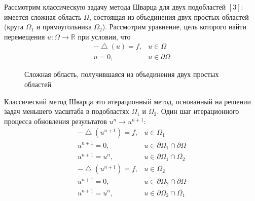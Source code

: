 \documentclass[a4paper, 14pt]{extarticle}
\begin{document}
Рассмотрим классическую задачу метода Шварца для двух подобластей $\left[3\right]$: имеется сложная область $\Omega$, состоящая из объединения двух простых областей (круга $\Omega_1$ и прямоугольника $\Omega_2$). Рассмотрим уравнение, цель которого найти перемещения $u: \Omega \rightarrow \mathbb{R}$ при условии, что
\begin{equation*}
\begin{array}{rl}
-\bigtriangleup \!(u) = f, & u \in \Omega \\
u = 0, & u \in \partial \Omega
\end{array}
\end{equation*}

\begin{figure}[h]
\caption{Сложная область, получившаяся из объединения двух простых областей}
\label{fig:image_01}
\end{figure}

Классический метод Шварца это итерационный метод, основанный на решении задач меньшего масштаба в подобластях $\Omega_1$ и $\Omega_2$. Один шаг итерационного процесса обновления результатов $u^n \rightarrow u^{n+1}$:
\begin{eqnarray*}
-\bigtriangleup \! (u^{n+1}) = f, & u \in \Omega_1 \\
u^{n+1} = 0, & u \in \partial \Omega_1 \cap \partial \Omega \\
u^{n+1} = u^n, & u \in \partial \Omega_1 \cap \bar{\Omega_2}
\end{eqnarray*}
\begin{eqnarray*}
-\bigtriangleup \! (u^{n+1}) = f, & u \in \Omega_2 \\
u^{n+1} = 0, & u \in \partial \Omega_2 \cap \partial \Omega \\
u^{n+1} = u^n, & u \in \partial \Omega_2 \cap \bar{\Omega_1}
\end{eqnarray*}
\end{document}
